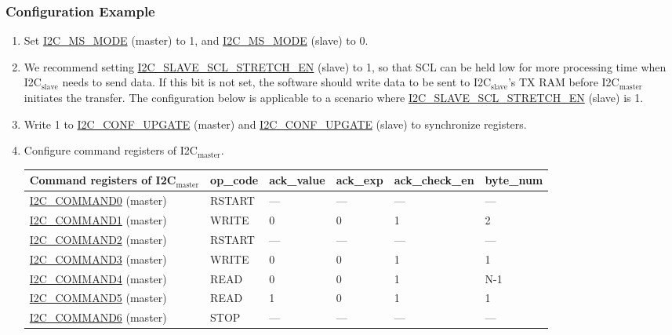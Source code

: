 \documentclass[main\_\_EN.tex]{subfiles}
\begin{document}
\subsubsection{Configuration Example}
\begin{enumerate}
\item Set \hyperref[fielddesc:I2CMSMODE]{I2C\_MS\_MODE} (master) to 1, and \hyperref[fielddesc:I2CMSMODE]{I2C\_MS\_MODE} (slave) to 0.
\item We recommend setting \hyperref[fielddesc:I2CSLAVESCLSTRETCHEN]{I2C\_SLAVE\_SCL\_STRETCH\_EN} (slave) to 1, so that SCL can be held low for more processing time when I2C$_\text{slave}$ needs to send data. If this bit is not set, the software should write data to be sent to I2C$_\text{slave}$'s TX RAM before I2C$_\text{master}$ initiates the transfer. The configuration below is applicable to a scenario where \hyperref[fielddesc:I2CSLAVESCLSTRETCHEN]{I2C\_SLAVE\_SCL\_STRETCH\_EN} (slave) is 1.
\item Write 1 to \hyperref[fielddesc:I2CCONFUPGATE]{I2C\_CONF\_UPGATE} (master) and \hyperref[fielddesc:I2CCONFUPGATE]{I2C\_CONF\_UPGATE} (slave) to synchronize registers.
\item Configure command registers of I2C$_\text{master}$.

\begin{longtable}{ | p{5cm} | p{1.5cm} | p{1.5cm} | p{1.5cm} |p{2.5cm} | p{1.5cm}|}
\hline\rowcolor{lightgray}
Command registers of I2C$_\text{master}$& op\_code & ack\_value&ack\_exp&ack\_check\_en&byte\_num  \\ \hline
\hyperref[fielddesc:I2CCOMMAND0]{I2C\_COMMAND0} (master)& RSTART& ---&---&---&---  \\ \hline
\hyperref[fielddesc:I2CCOMMAND1]{I2C\_COMMAND1} (master)& WRITE& 0&0&1&2  \\ \hline
\hyperref[fielddesc:I2CCOMMAND2]{I2C\_COMMAND2} (master)& RSTART& ---&---&---&---  \\ \hline
\hyperref[fielddesc:I2CCOMMAND3]{I2C\_COMMAND3} (master)& WRITE& 0&0&1&1  \\ \hline
\hyperref[fielddesc:I2CCOMMAND4]{I2C\_COMMAND4} (master)& READ& 0&0&1&N-1  \\ \hline
\hyperref[fielddesc:I2CCOMMAND5]{I2C\_COMMAND5} (master)& READ& 1&0&1&1  \\ \hline
\hyperref[fielddesc:I2CCOMMAND6]{I2C\_COMMAND6} (master)& STOP& ---&---&---&---  \\ \hline
\end{longtable}


\end{enumerate}
\end{document}
